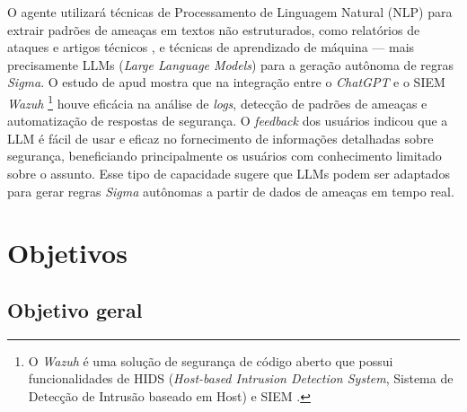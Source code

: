 O agente utilizará técnicas de Processamento de Linguagem Natural (NLP) para extrair padrões de ameaças em textos não estruturados, como relatórios de ataques e artigos técnicos \cite{Shah2022}, e técnicas de aprendizado de máquina --- mais precisamente LLMs (\textit{Large Language Models}) para a geração autônoma de regras \textit{Sigma}.
O estudo de  apud  mostra que na integração entre o \textit{ChatGPT} e o SIEM \textit{Wazuh}
\footnote{O \textit{Wazuh} é uma solução de segurança de código aberto que possui funcionalidades de HIDS (\textit{Host-based Intrusion Detection System}, Sistema de Detecção de Intrusão baseado em Host) e SIEM \cite{Wazuh_Official}.} 
houve eficácia na análise de \textit{logs}, detecção de padrões de ameaças e automatização de respostas de segurança. 
O \textit{feedback} dos usuários indicou que a LLM é fácil de usar e eficaz no fornecimento de informações detalhadas sobre segurança, beneficiando principalmente os usuários com conhecimento limitado sobre o assunto. 
Esse tipo de capacidade sugere que LLMs podem ser adaptados para gerar regras \textit{Sigma} autônomas a partir de dados de ameaças em tempo real. 



\section{Objetivos}\label{sec:objetivos}

\subsection{Objetivo geral}\label{subsec:objetivoGeral}

